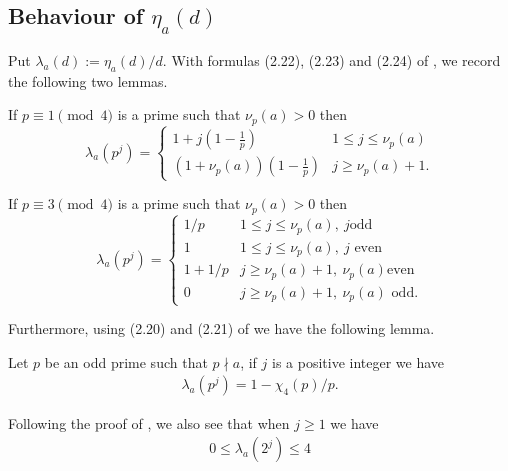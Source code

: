 \documentclass[12pt]{amsart}
\newcommand{\1}{\mathmybb{1}}
\begin{document}
\subsection{Behaviour of $\eta_{a}(d)$} \text{ }
\text{ }


Put $\lambda_{a}(d):= \eta_{a}(d)/d$. With formulas (2.22), (2.23) and (2.24) of \cite{Blomer}, we record the following two lemmas.
\begin{lem}
\label{1mod4adv}
If $p \equiv 1 \pmod 4$ is a prime such that $\nu_{p}(a)> 0$ then
\[
\lambda_{a}(p^{j}) = 
\begin{cases}
1 + j(1-\frac{1}{p}) & 1 \leq j \leq \nu_{p}(a)\\
(1+\nu_{p}(a))(1-\frac{1}{p}) & j \geq \nu_{p}(a)+1.
\end{cases}
\]
\end{lem}

\begin{lem}
\label{3mod4adv}
If $p \equiv 3 \pmod 4$ is a prime such that $\nu_{p}(a)> 0$ then
\[
\lambda_{a}(p^{j}) = 
\begin{cases}
1/p & 1 \leq j \leq \nu_{p}(a), \ j \text{odd}\\
1 & 1 \leq j \leq \nu_{p}(a), \ j \text{ even}\\
1+1/p & j \geq \nu_{p}(a)+1, \ \nu_{p}(a) \text{even}\\
0 & j \geq \nu_{p}(a)+1, \ \nu_{p}(a) \text{ odd}.
\end{cases}
\]
\end{lem}
Furthermore, using (2.20) and (2.21) of \cite{Blomer} we have the following lemma.
\begin{lem}
\label{coprimelem}
Let $p$ be an odd prime such that $p \nmid a$, if $j$ is a positive integer we have
\begin{align*}
\lambda_{a}(p^{j}) = 1 - \chi_{4}(p)/p.
\end{align*}
\end{lem}
Following the proof of \cite[Lemma 2.8]{Blomer}, we also see that when $j \geq 1$ we have
\begin{align}
\label{Twopower}
0\leq\lambda_{a}(2^{j})\leq 4
\end{align}
\end{document}
